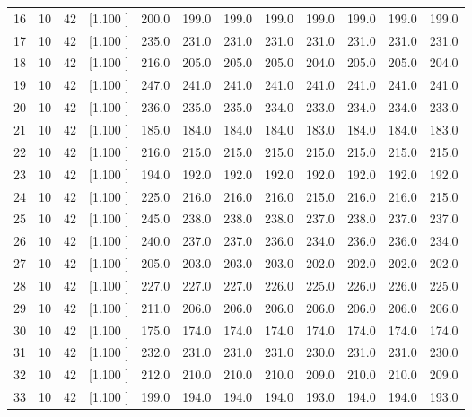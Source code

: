 \documentclass[12pt,a4paper]{article}
\begin{document}
\begin{center}
{\begin{tabular}{r r r r r r r r r r r r}
  16& 10& 42&[1.100     ]&   200.0&   199.0&   199.0&   199.0&   199.0&   199.0&   199.0&   199.0\\[-0.02in]
  17& 10& 42&[1.100     ]&   235.0&   231.0&   231.0&   231.0&   231.0&   231.0&   231.0&   231.0\\[-0.02in]
  18& 10& 42&[1.100     ]&   216.0&   205.0&   205.0&   205.0&   204.0&   205.0&   205.0&   204.0\\[-0.02in]
  19& 10& 42&[1.100     ]&   247.0&   241.0&   241.0&   241.0&   241.0&   241.0&   241.0&   241.0\\[-0.02in]
  20& 10& 42&[1.100     ]&   236.0&   235.0&   235.0&   234.0&   233.0&   234.0&   234.0&   233.0\\[-0.02in]
  21& 10& 42&[1.100     ]&   185.0&   184.0&   184.0&   184.0&   183.0&   184.0&   184.0&   183.0\\[-0.02in]
  22& 10& 42&[1.100     ]&   216.0&   215.0&   215.0&   215.0&   215.0&   215.0&   215.0&   215.0\\[-0.02in]
  23& 10& 42&[1.100     ]&   194.0&   192.0&   192.0&   192.0&   192.0&   192.0&   192.0&   192.0\\[-0.02in]
  24& 10& 42&[1.100     ]&   225.0&   216.0&   216.0&   216.0&   215.0&   216.0&   216.0&   215.0\\[-0.02in]
  25& 10& 42&[1.100     ]&   245.0&   238.0&   238.0&   238.0&   237.0&   238.0&   237.0&   237.0\\[-0.02in]
  26& 10& 42&[1.100     ]&   240.0&   237.0&   237.0&   236.0&   234.0&   236.0&   236.0&   234.0\\[-0.02in]
  27& 10& 42&[1.100     ]&   205.0&   203.0&   203.0&   203.0&   202.0&   202.0&   202.0&   202.0\\[-0.02in]
  28& 10& 42&[1.100     ]&   227.0&   227.0&   227.0&   226.0&   225.0&   226.0&   226.0&   225.0\\[-0.02in]
  29& 10& 42&[1.100     ]&   211.0&   206.0&   206.0&   206.0&   206.0&   206.0&   206.0&   206.0\\[-0.02in]
  30& 10& 42&[1.100     ]&   175.0&   174.0&   174.0&   174.0&   174.0&   174.0&   174.0&   174.0\\[-0.02in]
  31& 10& 42&[1.100     ]&   232.0&   231.0&   231.0&   231.0&   230.0&   231.0&   231.0&   230.0\\[-0.02in]
  32& 10& 42&[1.100     ]&   212.0&   210.0&   210.0&   210.0&   209.0&   210.0&   210.0&   209.0\\[-0.02in]
  33& 10& 42&[1.100     ]&   199.0&   194.0&   194.0&   194.0&   193.0&   194.0&   194.0&   193.0\\[-0.02in]

\end{tabular}}
\end{center}
\end{document}
